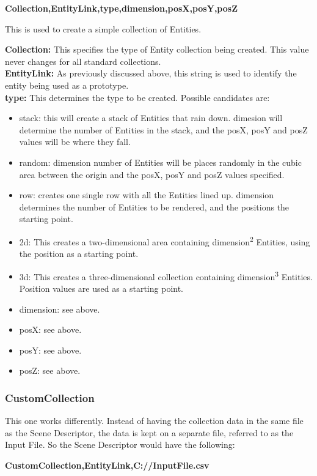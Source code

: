 \documentclass[a4paper,12pt]{article}
\begin{document}
\textbf{Collection,EntityLink,type,dimension,posX,posY,posZ}

This is used to create a simple collection of Entities.

\textbf{Collection:} This specifies the type of Entity collection being created. This value never changes for all standard collections.\\
\textbf{EntityLink:} As previously discussed above, this string is used to identify the entity being used as a prototype.\\
\textbf{type:} This determines the type to be created. Possible candidates are:
\begin{itemize}
\item stack: this will create a stack of Entities that rain down. dimesion will determine the number of Entities in the stack, and the posX, posY and posZ values will be where they fall.
\item random: dimension number of Entities will be places randomly in the cubic area between the origin and the posX, posY and posZ values specified.
\item row: creates one single row with all the Entities lined up. dimension determines the number of Entities to be rendered, and the positions the starting point.
\item 2d: This creates a two-dimensional area containing dimension\textsuperscript{2} Entities, using the position as a starting point.
\item 3d: This creates a three-dimensional collection containing dimension\textsuperscript{3} Entities. Position values are used as a starting point.
\item dimension: see above.
\item posX: see above.
\item posY: see above.
\item posZ: see above.
\end{itemize}

\subsubsection{CustomCollection}

This one works differently. Instead of having the collection data in the same file as the Scene Descriptor, the data is kept on a separate file, referred to as the Input File. So the Scene Descriptor would have the following:

\textbf{CustomCollection,EntityLink,C://InputFile.csv}
\end{document}
